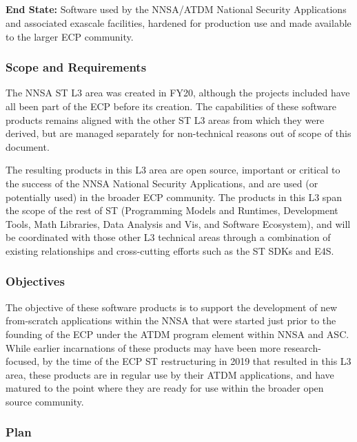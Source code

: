 \subsection{ \nnsa}\label{subsect:nnsa}

\textbf{End State:} Software used by the NNSA/ATDM National Security
Applications and associated exascale facilities, hardened for
production use and made available to the larger ECP community.

\subsubsection{Scope and Requirements}
The NNSA ST L3 area was created in FY20, although the projects included
have all been part of the ECP before its creation. The capabilities of these
software products remains aligned with the other ST
L3 areas from which they were derived, but are managed separately for
non-technical reasons out of scope of this document.

The resulting products in this L3 area 
are open source, important or critical to the success of the NNSA
National Security Applications, and are used (or potentially used) in
the broader ECP community. The products in this L3 span the scope of
the rest of ST (Programming Models and Runtimes, Development Tools,
Math Libraries, Data Analysis and Vis, and Software Ecosystem), and
will be coordinated with those other L3 technical 
areas through a combination of existing relationships and
cross-cutting efforts such as the ST SDKs and E4S.  

\subsubsection{Objectives}

The objective of these software products is to support the
development of new from-scratch applications within the NNSA that were
started just prior to the founding of the ECP under the ATDM 
program element within NNSA and
ASC. While earlier incarnations of these products may have been more
research-focused, by the time of the ECP ST restructuring in 2019 that
resulted in this L3 area, these products are in regular use by their
ATDM applications, and have matured to the point where they are ready
for use within the broader open source community.

\subsubsection{Plan}

